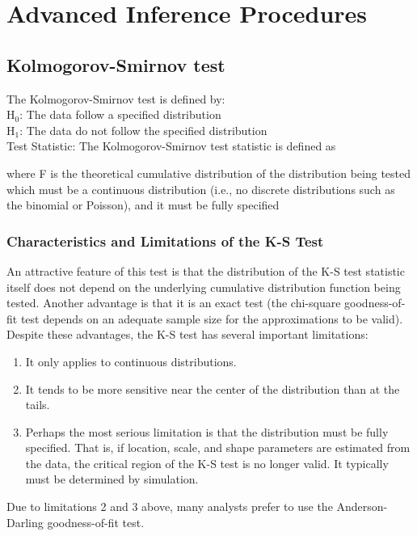 \chapter{Advanced Inference Procedures}






\section{Kolmogorov-Smirnov test}
The Kolmogorov-Smirnov test is defined by:
\\
H$_0$:     The data follow a specified distribution\\
H$_1$:     The data do not follow the specified distribution\\

Test Statistic:     The Kolmogorov-Smirnov test statistic is defined as

where F is the theoretical cumulative distribution of the distribution being tested which must be a continuous distribution (i.e., no discrete distributions such as the binomial or Poisson), and it must be fully specified

\subsection{ Characteristics and Limitations of the K-S Test}


An attractive feature of this test is that the distribution of the K-S test statistic itself does not depend on the underlying cumulative distribution function being tested. Another advantage is that it is an exact test (the chi-square goodness-of-fit test depends on an adequate sample size for the approximations to be valid). Despite these advantages, the K-S test has several important limitations:
\begin{enumerate}
	\item It only applies to continuous distributions.
	\item It tends to be more sensitive near the center of the distribution than at the tails.
	\item Perhaps the most serious limitation is that the distribution must be fully specified. That is, if location, scale, and shape parameters are estimated from the data, the critical region of the K-S test is no longer valid. It typically must be determined by simulation.
\end{enumerate}
Due to limitations 2 and 3 above, many analysts prefer to use the Anderson-Darling goodness-of-fit test.

